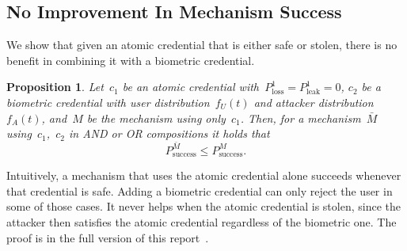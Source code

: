 \documentclass[conference,compsoc]{IEEEtran}
\newtheorem{proposition}{Proposition}
\begin{document}
\subsection{No Improvement In Mechanism Success}\label{sec:no_success_improvement}
\noindent
We show that given an atomic credential that is either safe or stolen, there is no benefit in combining it with a biometric credential.
\begin{proposition}\label{thm:no_improvement}
    Let~$c_1$ be an atomic credential with~${P^1_\text{loss} = P^1_\text{leak} = 0}$, $c_2$ be a biometric credential with user distribution~$f_U(t)$ and attacker distribution~$f_A(t)$, and~$M$ be the mechanism using only~$c_1$. Then, for a mechanism~$\bar{M}$ using~$c_1$,~$c_2$ in \emph{AND} or \emph{OR} compositions it holds that
    \begin{equation*}
        P_{\mathrm{success}}^{\bar{M}} \le P_{\mathrm{success}}^{M}.
    \end{equation*}
\end{proposition}
\noindent
Intuitively, a mechanism that uses the atomic credential alone succeeds whenever that credential is safe. 
Adding a biometric credential can only reject the user in some of those cases. 
It never helps when the atomic credential is stolen, since the attacker then satisfies the atomic credential regardless of the biometric one. 
The proof is in the full version of this report~\cite{biometric_full_version}.
\end{document}

